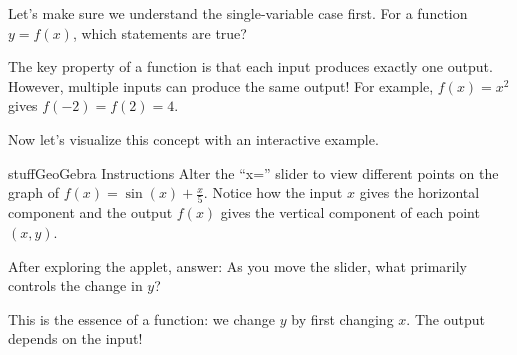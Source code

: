 \documentclass{ximera}
\begin{document}
\begin{problem}
Let's make sure we understand the single-variable case first. For a function $y = f(x)$, which statements are true?

\begin{selectAll}
\end{selectAll}

\begin{feedback}
The key property of a function is that each input produces exactly one output. However, multiple inputs can produce the same output! For example, $f(x) = x^2$ gives $f(-2) = f(2) = 4$.
\end{feedback}
\end{problem}

\begin{problem}
Now let's visualize this concept with an interactive example.

\begin{expandable}{stuff}{GeoGebra Instructions}
    Alter the ``x='' slider to view different points on the graph of $f(x) = \sin(x) + \frac{x}{5}$. Notice how the input $x$ gives the horizontal component and the output $f(x)$ gives the vertical component of each point $(x,y)$.
\end{expandable}

\begin{center}
\end{center}

After exploring the applet, answer: As you move the slider, what primarily controls the change in $y$?

\begin{multipleChoice}
\end{multipleChoice}

\begin{feedback}
This is the essence of a function: we change $y$ by first changing $x$. The output depends on the input!
\end{feedback}
\end{problem}
\end{document}
